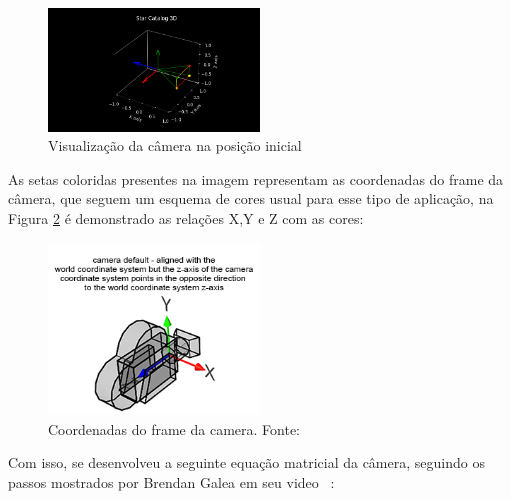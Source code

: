 \begin{figure}[H]
    \centering
    \includegraphics[width=0.5\textwidth]{images/posicao_inicial_camera.png}
    \caption{Visualização da câmera na posição inicial}
    \label{fig:posicao_inicial_camera}
\end{figure}

As setas coloridas presentes na imagem representam as coordenadas do frame da câmera, 
que seguem um esquema de cores usual para esse tipo de aplicação, 
na Figura \ref{fig:coordenadas} é demonstrado as relações X,Y e Z com as cores:

\begin{figure}[H]
    \centering
    \includegraphics[width=0.5\textwidth]{images/coordenadas.png}
    \caption{Coordenadas do frame da camera. Fonte: ~\cite[]{the_free_dictionary}}
    \label{fig:coordenadas}
\end{figure}


Com isso, se desenvolveu a seguinte equação matricial da câmera, 
seguindo os passos mostrados por Brendan Galea em seu video ~\cite[]{Galea}:

